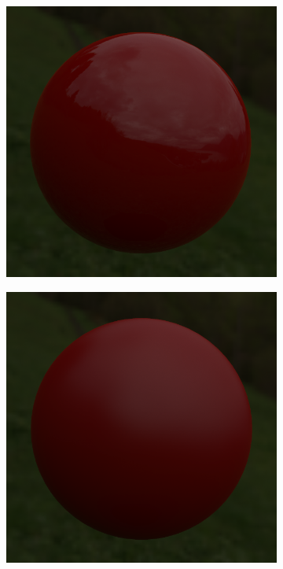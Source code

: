 \begin{figure}[!ht]
    \centering
    \begin{subfigure}[b]{0.28\textwidth}
        \centering
        \includegraphics[width=\textwidth]{images/marmoset_r1.png}
    \end{subfigure}
    \hfill
    \begin{subfigure}[b]{0.28\textwidth}
        \centering
        \includegraphics[width=\textwidth]{images/marmoset_r05.png}

\end{subfigure}
\end{figure}
